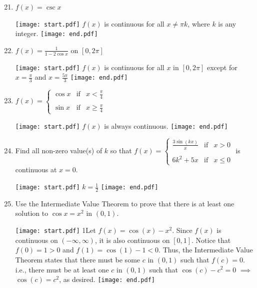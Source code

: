 \documentclass[12pt]{article}
\begin{document}

\begin{enumerate}
\setcounter{enumi}{20}

\item $f(x) = \csc{x}$ 

\texttt{[image: start.pdf]}
{{$f(x)$ is continuous for all $x \neq \pi k$, where $k$ is any integer.}}
\texttt{[image: end.pdf]}


\item $\displaystyle f(x) = \frac{1}{1-2\cos{x}}$ on $[0,2\pi]$ 

\texttt{[image: start.pdf]}
{{$f(x)$ is continuous for all $x$ in $[0,2\pi]$ except for $\displaystyle x=\frac{\pi}{3}$ and $\displaystyle x=\frac{5\pi}{3}$}}
\texttt{[image: end.pdf]}


\item $\displaystyle f(x)=\left\{
\begin{array}{lll}
\cos{x} & \text{if} & x< \frac{\pi}{4}\\
&\\
\sin{x} & \text{if} & x\geq \frac{\pi}{4}
\end{array}\right.$

\texttt{[image: start.pdf]}
{{$f(x)$ is always continuous.}}
\texttt{[image: end.pdf]}


\item Find all non-zero value(s) of $k$ so that $\displaystyle f(x)=\left\{\begin{array}{lll}
\frac{3\sin{(kx)}}{x} & \text{if} & x>0\\
&&\\
6k^2+5x & \text{if} & x \leq 0
\end{array}\right.$
is continuous at $x=0$.

\texttt{[image: start.pdf]}
{{$\displaystyle k=\frac{1}{2}$}}
\texttt{[image: end.pdf]}


\item Use the Intermediate Value Theorem to prove that there is at least one solution to $\cos{x}=x^2$ in $(0,1)$.

\texttt{[image: start.pdf]}
{{{1\linewidth}{Let $f(x)=\cos{(x)}-x^2$.  Since $f(x)$ is continuous on $(-\infty,\infty)$, it is also continuous on $[0,1]$.  Notice that $f(0)=1>0$ and $f(1)=\cos{(1)}-1<0$.  Thus, the Intermediate Value Theorem states that there must be some $c$ in $(0,1)$ such that $f(c)=0$.  i.e., there must be at least one $c$ in $(0,1)$ such that $\cos(c)-c^2=0$ $\implies$ $\cos{(c)}=c^2$, as desired.}}}
\texttt{[image: end.pdf]}




\end{enumerate}
\end{document}
